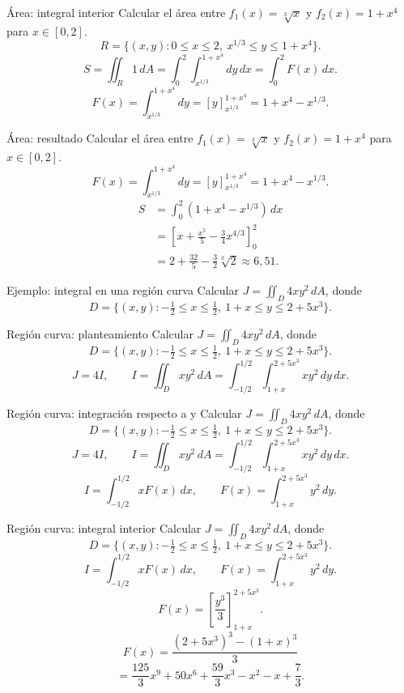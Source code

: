 \documentclass[main.tex]{subfiles}
\begin{document}
\begin{frame}{Área: integral interior}
\small Calcular el área entre $f_1(x)=\sqrt[3]{x}$ y $f_2(x)=1+x^4$ para $x\in[0,2]$.\[R=\{(x,y):0\le x\le2,\ x^{1/3}\le y\le1+x^4\}.\]\[S=\iint_R1\,dA=\int_0^2\int_{x^{1/3}}^{1+x^4}dy\,dx=\int_0^2 F(x)\,dx.\]\[F(x)=\int_{x^{1/3}}^{1+x^4}dy=[y]_{x^{1/3}}^{1+x^4}=1+x^4-x^{1/3}.\]
\end{frame}

\begin{frame}{Área: resultado}
\small Calcular el área entre $f_1(x)=\sqrt[3]{x}$ y $f_2(x)=1+x^4$ para $x\in[0,2]$.\[F(x)=\int_{x^{1/3}}^{1+x^4}dy=[y]_{x^{1/3}}^{1+x^4}=1+x^4-x^{1/3}.\]\begin{align*}S&=\int_0^2(1+x^4-x^{1/3})\,dx\\&=\left[x+\frac{x^5}{5}-\frac34x^{4/3}\right]_0^2\\&=2+\frac{32}{5}-\frac32\sqrt[3]2\approx6{,}51.\end{align*}
\end{frame}

\begin{frame}{Ejemplo: integral en una región curva}
\small Calcular $J=\iint_D4xy^2\,dA$, donde\[D=\{(x,y):-\tfrac12\le x\le\tfrac12,\ 1+x\le y\le2+5x^3\}.\]
\end{frame}

\begin{frame}{Región curva: planteamiento}
\small Calcular $J=\iint_D4xy^2\,dA$, donde\[D=\{(x,y):-\tfrac12\le x\le\tfrac12,\ 1+x\le y\le2+5x^3\}.\]\[J=4I,\qquad I=\iint_Dxy^2\,dA=\int_{-1/2}^{1/2}\int_{1+x}^{2+5x^3}xy^2\,dy\,dx.\]
\end{frame}

\begin{frame}{Región curva: integración respecto a y}
\small Calcular $J=\iint_D4xy^2\,dA$, donde\[D=\{(x,y):-\tfrac12\le x\le\tfrac12,\ 1+x\le y\le2+5x^3\}.\]\[J=4I,\qquad I=\iint_Dxy^2\,dA=\int_{-1/2}^{1/2}\int_{1+x}^{2+5x^3}xy^2\,dy\,dx.\]\[I=\int_{-1/2}^{1/2}xF(x)\,dx,\qquad F(x)=\int_{1+x}^{2+5x^3}y^2\,dy.\]
\end{frame}

\begin{frame}{Región curva: integral interior}
\small Calcular $J=\iint_D4xy^2\,dA$, donde\[D=\{(x,y):-\tfrac12\le x\le\tfrac12,\ 1+x\le y\le2+5x^3\}.\]\[I=\int_{-1/2}^{1/2}xF(x)\,dx,\qquad F(x)=\int_{1+x}^{2+5x^3}y^2\,dy.\]\[F(x)=\left[\frac{y^3}{3}\right]_{1+x}^{2+5x^3}.\]\[F(x)=\frac{(2+5x^3)^3-(1+x)^3}{3}\]\[=\frac{125}{3}x^9+50x^6+\frac{59}{3}x^3-x^2-x+\frac73.\]
\end{frame}
\end{document}
